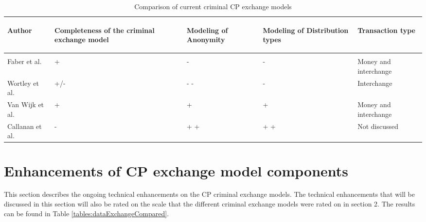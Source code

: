 \documentclass{sig-alternate-br}
\begin{document}
\begin{table}[!ht]
\caption{Comparison of current criminal CP exchange models}
\begin{tabular}{|p{}||p{}|p{}|p{}|p{}|}
\hline
\begin{sideways} \parbox{30mm}{\centering Author} \end{sideways} & \begin{sideways} \parbox{30mm}{\centering Completeness of the criminal exchange model} \end{sideways} & \begin{sideways} \parbox{30mm}{\centering Modeling of Anonymity} \end{sideways} &  \begin{sideways} \parbox{30mm}{\centering Modeling of Distribution types} \end{sideways} & \begin{sideways} \parbox{30mm}{\centering Transaction type} \end{sideways} \\ \hline & \\[-1em]\hline
Faber et al. \cite{en2011phishing} & + & - & - & Money and interchange \\ \hline
Wortley et al. \cite{wortley2006child} & +/- & - - & -  & Interchange \\ \hline
Van Wijk et al. \cite{wijk2009achter}   & + & + & + & Money and interchange \\ \hline
Callanan et al. \cite{callanan2009internet}   & - & + + & + + & Not discussed \\ \hline
\end{tabular}
\label{tables:exchangeModelsCompared}
\end{table}


\section{Enhancements of CP exchange model components}
This section describes the ongoing technical enhancements on the CP criminal exchange models. The technical enhancements that will be discussed in this section will also be rated on the scale that the different criminal exchange models were rated on in section 2. The results can be found in Table \ref{tables:dataExchangeCompared}.
\end{document}
